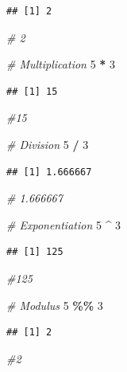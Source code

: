 \documentclass[
  b5paper]{book}
\newenvironment{Shaded}{\begin{snugshade}}{\end{snugshade}}
\newcommand{\CommentTok}[1]{\textcolor[rgb]{0.56,0.35,0.01}{\textit{#1}}}
\newcommand{\DecValTok}[1]{\textcolor[rgb]{0.00,0.00,0.81}{#1}}
\newcommand{\SpecialCharTok}[1]{\textcolor[rgb]{0.81,0.36,0.00}{\textbf{#1}}}
\begin{document}
\begin{verbatim}
## [1] 2
\end{verbatim}

\begin{Shaded}
\begin{Highlighting}[]
\CommentTok{\# 2}

\CommentTok{\# Multiplication}
\DecValTok{5} \SpecialCharTok{*} \DecValTok{3}
\end{Highlighting}
\end{Shaded}

\begin{verbatim}
## [1] 15
\end{verbatim}

\begin{Shaded}
\begin{Highlighting}[]
\CommentTok{\#15}

\CommentTok{\# Division}
\DecValTok{5} \SpecialCharTok{/} \DecValTok{3}
\end{Highlighting}
\end{Shaded}

\begin{verbatim}
## [1] 1.666667
\end{verbatim}

\begin{Shaded}
\begin{Highlighting}[]
\CommentTok{\# 1.666667}

\CommentTok{\# Exponentiation}
\DecValTok{5} \SpecialCharTok{\^{}} \DecValTok{3}
\end{Highlighting}
\end{Shaded}

\begin{verbatim}
## [1] 125
\end{verbatim}

\begin{Shaded}
\begin{Highlighting}[]
\CommentTok{\#125}

\CommentTok{\# Modulus}
\DecValTok{5} \SpecialCharTok{\%\%} \DecValTok{3}
\end{Highlighting}
\end{Shaded}

\begin{verbatim}
## [1] 2
\end{verbatim}

\begin{Shaded}
\begin{Highlighting}[]
\CommentTok{\#2}
\end{Highlighting}
\end{Shaded}
\end{document}
